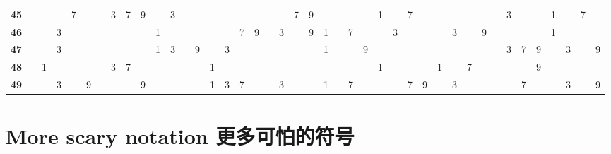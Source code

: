 {\begin{tabular}{|lr|cccc|cccc|cccc|cccc|cccc|cccc|cccc|cccc|cccc|cccc|}
    \rule{0pt}{9pt}\bf 45      &                            &                            &                            & 7 &   &   & 3 & 7 & 9 &   & 3 &   &   &   &   &   &   &   &   & 7 & 9 &   &   &   &   & 1 &   & 7 &   &   &   &   &   &   & 3 &   &   & 1 &   & 7 &   \\
    \bf 46                     &                            &                            & 3                          &   &   &   &   &   &   & 1 &   &   &   &
                               &                            & 7                          & 9                          &   & 3 &   & 9 & 1 &   & 7 &   &   & 3 &   &   &   & 3 &   & 9 &   &   &   &   & 1 &   &   &                                                           \\
    \bf 47                     &                            &                            & 3                          &   &   &   &   &   &   & 1 & 3 &   & 9 &   & 3 &   &   &   &   &   &   & 1 &   &   & 9 &   &   &   &   &   &   &   &   &   & 3 & 7 & 9 &   & 3 &   & 9 \\
    \bf 48                     &                            & 1                          &                            &   &
                               &                            & 3                          & 7                          &   &   &   &   &   & 1 &   &   &   &   &   &   &   &   &   &   &   & 1 &   &   &   & 1 &   & 7 &   &   &   &   & 9 &   &   &   &                       \\
    \bf 49                     &                            &                            & 3                          &   & 9 &   &   &   & 9 &   &   &   &   & 1 & 3 & 7 &   &   & 3 &   &   & 1 &   & 7 &   &
                               &                            & 7                          & 9                          &   & 3 &   &   &   &   & 7 &   &   & 3 &   & 9
    \\ \hline
  \end{tabular}
}

\addtolength{\lineskip}{2pt}
\renewcommand{\arraystretch}{1}

\clearpage





\newpage

\section{More scary notation 更多可怕的符号}
\label{sec:scary}


